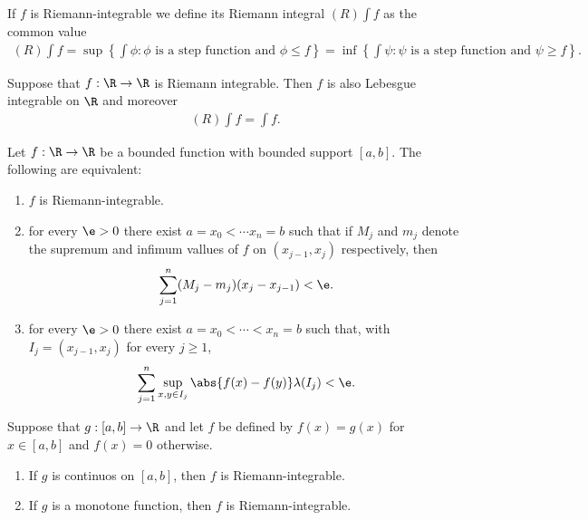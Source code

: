 \documentclass{article}
\begin{document}
\begin{definition}[Notes 4.5]
    If $f$ is Riemann-integrable we define its Riemann integral $(R) \int f$ as the common
    value
    \begin{align*}
        (R) \int f
        =\sup\left\lbrace\int\phi : \phi\text{ is a step function and }\phi\leq f\right\rbrace
        = \inf\left\lbrace\int\psi : \psi\text{ is a step function and }\psi \geq f\right\rbrace.
    \end{align*}
\end{definition}

\begin{theorem}[Notes 4.6]
    Suppose that $f:\R\to\R$ is Riemann integrable. Then $f$ is also Lebesgue integrable on $\R$
    and moreover
    \begin{align*}
        (R) \int f = \int f.
    \end{align*}
\end{theorem}

\begin{lemma}[Notes 4.1]
    Let $f:\R\to\R$ be a bounded function with bounded support $[a,b]$. The following are equivalent:
    \begin{enumerate}
        \item $f$ is Riemann-integrable.
        \item for every $\e>0$ there exist $a=x_0<\cdots x_n=b$ such that if $M_j$ and $m_j$
              denote the supremum and infimum vallues of $f$ on $(x_{j-1}, x_j)$ respectively, then \begin{align*}
                  \sum_{j=1}^n (M_j-m_j)(x_j-x_{j-1})<\e.
              \end{align*}
        \item for every $\e>0$ there exist $a=x_0<\cdots<x_n=b$ such that, with $I_j=(x_{j-1},x_j)$
              for every $j\geq 1$, \begin{align*}
                  \sum_{j=1}^n \sup_{x,y\in I_j} \abs{f(x)-f(y)}\lambda(I_j)<\e.
              \end{align*}
    \end{enumerate}
\end{lemma}

\begin{theorem}[Notes 4.7]
    Suppose that $g:[a,b]\to\R$ and let $f$ be defined by $f(x)=g(x)$ for $x\in[a,b]$ and $f(x)=0$
    otherwise.
    \begin{enumerate}
        \item If $g$ is continuos on $[a,b]$, then $f$ is Riemann-integrable.
        \item If $g$ is a monotone function, then $f$ is Riemann-integrable.
    \end{enumerate}
\end{theorem}
\end{document}
